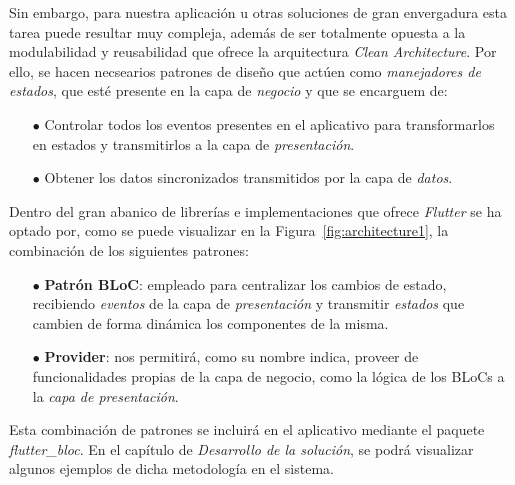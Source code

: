 Sin embargo, para nuestra aplicación u otras soluciones de gran envergadura esta tarea puede resultar muy compleja,
además de ser totalmente opuesta a la modulabilidad y reusabilidad que ofrece la arquitectura \textit{Clean Architecture}.
Por ello, se hacen necsearios patrones de diseño que actúen como
\textit{manejadores de estados}, que esté presente en la capa de \textit{negocio} y que se encarguem de:

\begin{itemize}
  \item[$\bullet$] Controlar todos los eventos presentes en el aplicativo 
  para transformarlos en estados y transmitirlos a la capa de \textit{presentación}.
  \item[$\bullet$] Obtener los datos sincronizados transmitidos por la capa de \textit{datos}.
\end{itemize}

Dentro del gran abanico de librerías e implementaciones que ofrece \textit{Flutter} se ha optado por, como se puede 
visualizar en la Figura~\ref{fig:architecture1}, la combinación de los siguientes patrones:

\begin{itemize}
  \item[$\bullet$] \textbf{Patrón BLoC}: empleado para centralizar los cambios de estado, recibiendo \textit{eventos}
   de la capa de \textit{presentación} y transmitir \textit{estados} que cambien de forma dinámica los componentes de
    la misma.
  \item[$\bullet$] \textbf{Provider}: nos permitirá, como su nombre indica, proveer de funcionalidades propias
  de la capa de negocio, como la lógica de los BLoCs a la \textit{capa de presentación}.
\end{itemize}

Esta combinación de patrones se incluirá en el aplicativo mediante el paquete \textit{flutter\_bloc}.
En el capítulo de \textit{Desarrollo de la solución}, se podrá visualizar algunos ejemplos de dicha metodología en
el sistema.
